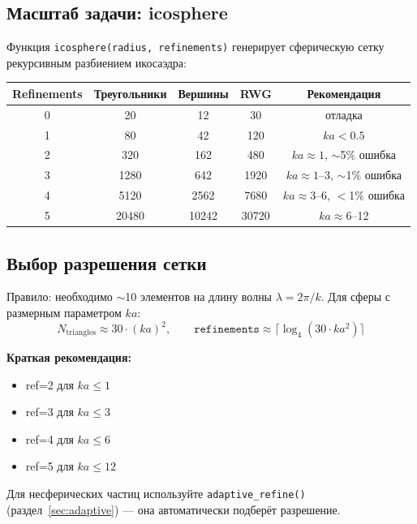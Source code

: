 \documentclass[12pt,a4paper]{article}
\begin{document}
\subsection{Масштаб задачи: icosphere}

Функция \texttt{icosphere(radius, refinements)} генерирует сферическую сетку рекурсивным разбиением икосаэдра:

\begin{center}
\begin{tabular}{ccccc}
\toprule
Refinements & Треугольники & Вершины & RWG & Рекомендация \\
\midrule
0 & 20 & 12 & 30 & отладка \\
1 & 80 & 42 & 120 & $ka < 0.5$ \\
2 & 320 & 162 & 480 & $ka \approx 1$, $\sim$5\% ошибка \\
3 & 1280 & 642 & 1920 & $ka \approx 1$--3, $\sim$1\% ошибка \\
4 & 5120 & 2562 & 7680 & $ka \approx 3$--6, $<$1\% ошибка \\
5 & 20480 & 10242 & 30720 & $ka \approx 6$--12 \\
\bottomrule
\end{tabular}
\end{center}

\subsection{Выбор разрешения сетки}

Правило: необходимо $\sim$10 элементов на длину волны $\lambda = 2\pi/k$. Для сферы с размерным параметром $ka$:
\begin{equation}
  N_{\mathrm{triangles}} \approx 30 \cdot (ka)^2, \qquad
  \texttt{refinements} \approx \lceil \log_4(30 \cdot ka^2) \rceil
\end{equation}

\textbf{Краткая рекомендация:}
\begin{itemize}
  \item ref=2 для $ka \leq 1$
  \item ref=3 для $ka \leq 3$
  \item ref=4 для $ka \leq 6$
  \item ref=5 для $ka \leq 12$
\end{itemize}

Для несферических частиц используйте \texttt{adaptive\_refine()} (раздел~\ref{sec:adaptive}) --- она автоматически подберёт разрешение.


\end{document}
